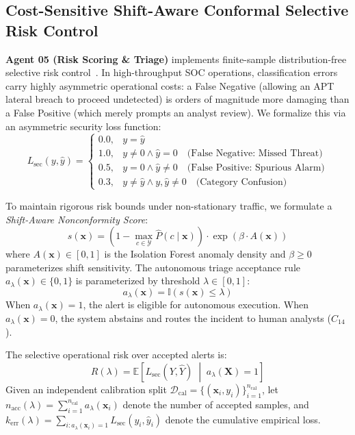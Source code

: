 \documentclass{ieeeaccess}
\begin{document}
\subsection{Cost-Sensitive Shift-Aware Conformal Selective Risk Control}
\label{sec:conformal_theory}
\textbf{Agent 05 (Risk Scoring \& Triage)} implements finite-sample distribution-free selective risk control~\cite{geifman2017selective, angelopoulos2024conformal}. In high-throughput SOC operations, classification errors carry highly asymmetric operational costs: a False Negative (allowing an APT lateral breach to proceed undetected) is orders of magnitude more damaging than a False Positive (which merely prompts an analyst review). We formalize this via an asymmetric security loss function:
\begin{equation}
L_{\text{sec}}(y, \hat{y}) = \begin{cases}
0.0, & y = \hat{y} \\
1.0, & y \ne 0 \wedge \hat{y} = 0 \quad \text{(False Negative: Missed Threat)} \\
0.5, & y = 0 \wedge \hat{y} \ne 0 \quad \text{(False Positive: Spurious Alarm)} \\
0.3, & y \ne \hat{y} \wedge y, \hat{y} \ne 0 \quad \text{(Category Confusion)}
\end{cases}
\end{equation}

To maintain rigorous risk bounds under non-stationary traffic, we formulate a \textit{Shift-Aware Nonconformity Score}:
\begin{equation}
s(\mathbf{x}) = \left( 1 - \max_{c \in \mathcal{Y}} \hat{P}(c \mid \mathbf{x}) \right) \cdot \exp\left( \beta \cdot A(\mathbf{x}) \right)
\end{equation}
where $A(\mathbf{x}) \in [0, 1]$ is the Isolation Forest anomaly density and $\beta \ge 0$ parameterizes shift sensitivity. The autonomous triage acceptance rule $a_\lambda(\mathbf{x}) \in \{0, 1\}$ is parameterized by threshold $\lambda \in [0, 1]$:
\begin{equation}
a_\lambda(\mathbf{x}) = \mathbb{I}(s(\mathbf{x}) \le \lambda)
\end{equation}
When $a_\lambda(\mathbf{x}) = 1$, the alert is eligible for autonomous execution. When $a_\lambda(\mathbf{x}) = 0$, the system abstains and routes the incident to human analysts ($C_{14}$).

The selective operational risk over accepted alerts is:
\begin{equation}
R(\lambda) = \mathbb{E}\left[ L_{\text{sec}}(Y, \hat{Y}) \;\middle|\; a_\lambda(\mathbf{X}) = 1 \right]
\end{equation}
Given an independent calibration split $\mathcal{D}_{\text{cal}} = \{(\mathbf{x}_i, y_i)\}_{i=1}^{n_{\text{cal}}}$, let $n_{\text{acc}}(\lambda) = \sum_{i=1}^{n_{\text{cal}}} a_\lambda(\mathbf{x}_i)$ denote the number of accepted samples, and $k_{\text{err}}(\lambda) = \sum_{i: a_\lambda(\mathbf{x}_i)=1} L_{\text{sec}}(y_i, \hat{y}_i)$ denote the cumulative empirical loss.
\end{document}
